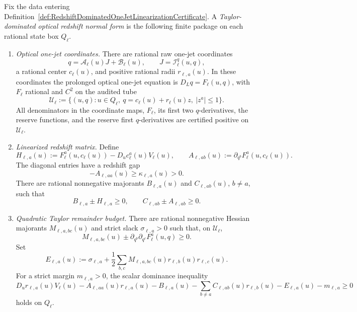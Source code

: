 \begin{definition}\label{def:TaylorDominatedOpticalRedshiftNormalForm}
Fix the data entering
Definition~\ref{def:RedshiftDominatedOneJetLinearizationCertificate}.  A
\emph{Taylor-dominated optical redshift normal form} is the following finite
package on each rational state box $Q_\ell$.
\begin{enumerate}
    \item \emph{Optical one-jet coordinates.}  There are rational raw one-jet
    coordinates
    \[
        q=\mathcal A_\ell(u)J+\mathcal B_\ell(u),
        \qquad J=\mathcal I_\ell^q(u,q),
    \]
    a rational center $c_\ell(u)$, and positive rational radii
    $r_{\ell,a}(u)$.  In these coordinates the prolonged optical one-jet
    equation is $D_Lq=F_\ell(u,q)$, with $F_\ell$ rational and $C^2$ on the
    audited tube
    \[
        \mathcal U_\ell
        :=
        \{(u,q):u\in Q_\ell,\ q=c_\ell(u)+r_\ell(u)z,\ |z^a|\le1\}.
    \]
    All denominators in the coordinate maps, $F_\ell$, its first two
    $q$-derivatives, the reserve functions, and the reserve first
    $q$-derivatives are certified positive on $\mathcal U_\ell$.

    \item \emph{Linearized redshift matrix.}  Define
    \[
        H_{\ell,a}(u):=
        F_\ell^a(u,c_\ell(u))-D_uc_\ell^a(u)V_\ell(u),
        \qquad
        A_{\ell,ab}(u):=
        \partial_{q^b}F_\ell^a(u,c_\ell(u)).
    \]
    The diagonal entries have a redshift gap
    \[
        -A_{\ell,aa}(u)\ge\kappa_{\ell,a}(u)>0 .
    \]
    There are rational nonnegative majorants $B_{\ell,a}(u)$ and
    $C_{\ell,ab}(u)$, $b\ne a$, such that
    \[
        B_{\ell,a}\pm H_{\ell,a}\ge0,
        \qquad
        C_{\ell,ab}\pm A_{\ell,ab}\ge0 .
    \]

    \item \emph{Quadratic Taylor remainder budget.}  There are rational
    nonnegative Hessian majorants $M_{\ell,a,bc}(u)$ and strict slack
    $\sigma_{\ell,a}>0$ such that, on $\mathcal U_\ell$,
    \[
        M_{\ell,a,bc}(u)
        \pm
        \partial_{q^b}\partial_{q^c}F_\ell^a(u,q)\ge0 .
    \]
    Set
    \[
        E_{\ell,a}(u)
        :=
        \sigma_{\ell,a}
        +
        \frac12
        \sum_{b,c}
        M_{\ell,a,bc}(u)r_{\ell,b}(u)r_{\ell,c}(u).
    \]
    For a strict margin $m_{\ell,a}>0$, the scalar dominance inequality
    \[
        D_ur_{\ell,a}(u)V_\ell(u)
        -A_{\ell,aa}(u)r_{\ell,a}(u)
        -B_{\ell,a}(u)
        -\sum_{b\ne a}C_{\ell,ab}(u)r_{\ell,b}(u)
        -E_{\ell,a}(u)
        -m_{\ell,a}
        \ge0
    \]
    holds on $Q_\ell$.


\end{enumerate}
\end{definition}
